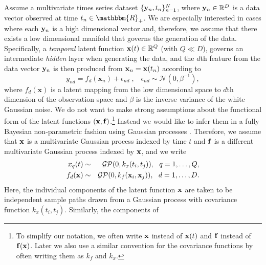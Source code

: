 \documentclass{article} %
\begin{document}
Assume a multivariate times series dataset $\{\mathbf{y}_n,t_n\}_{n=1}^N$,
where $\mathbf{y}_n \in \mathbb{R}^D$ is a data vector observed at time $t_n
\in \mathbbm{R}_+$. We are especially interested in cases where each $\mathbf{y}_n$ is
a high dimensional vector and, therefore, we assume that there exists a low
dimensional manifold that governs the generation of the data.
%
Specifically, a {\em temporal} latent function $\mathbf{x}(t) \in
\mathbb{R}^Q$ (with $Q \ll D$), governs an intermediate {\em hidden}
layer when generating the data, and the $d$th feature from the
data vector $\mathbf{y}_n$ is then produced from $\mathbf{x}_n = \mathbf{x}(t_n)$
according to
\begin{equation}
\label{generative}
\mathit{y_{nd}} = f_d(\mathbf{x}_n) + \epsilon_{nd} \;, \;\;\; \epsilon_{nd} \sim \mathcal{N}(0, \beta^{-1}),
\end{equation}
where %
$f_d(\mathbf{x})$ is a latent mapping from the low dimensional space
to $d$th dimension of the observation space and $\beta$ is the inverse
variance of the white Gaussian noise.  We do not want to make strong
assumptions about the functional form of the latent functions $(\mathbf{x},
\mathbf{f})$.\footnote{To simplify our notation, we often write $\mathbf{x}$
  instead of $\mathbf{x}(t)$ and $\mathbf{f}$ instead of $\mathbf{f}(\mathbf{x})$. Later we
  also use a similar convention for the covariance functions by often
  writing them as $\mathit{k}_f$ and $\mathit{k}_x$.} Instead we
would like to infer them in a fully Bayesian non-parametric fashion
using Gaussian processes \cite{rasmussen-williams}.  Therefore, we
assume that $\mathbf{x}$ is a multivariate Gaussian process indexed by time
$t$ and $\mathbf{f}$ is a different multivariate Gaussian process indexed by
$\mathbf{x}$, and we write
\begin{eqnarray}
x_q(t)  & \sim & \mathcal{GP}(0, k_x(t_i,t_j)), \ \ q=1,\ldots,Q, \\     
f_d(\bfx)  & \sim & \mathcal{GP}(0, k_f(\bfx_i,\bfx_j)), \ \ d=1,\ldots,D.
\label{eq:GPpriors}
\end{eqnarray}
Here, the individual components of the latent function $\mathbf{x}$ are
taken to be independent sample paths drawn from a Gaussian process
with covariance function $k_x(t_i,t_j)$. Similarly, the components of
\end{document}
